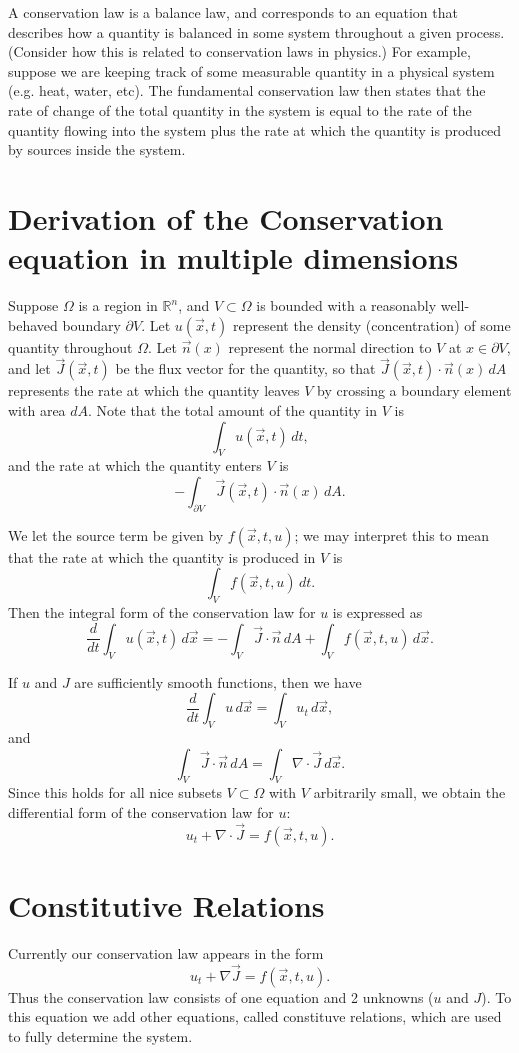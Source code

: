 \label{lab:finitedifference1}
A conservation law is a balance law, and corresponds to an equation that describes how a quantity is balanced in some system throughout a given process.
(Consider how this is related to conservation laws in physics.)
For example, suppose we are keeping track of some measurable quantity in a physical system (e.g. heat, water, etc).
The fundamental conservation law then states that the rate of change of the total quantity in the system is equal to the rate of the quantity flowing into the system plus the rate at which the quantity is produced by sources inside the system.

\section{Derivation of the Conservation equation in multiple dimensions}
Suppose $\Omega$ is a region in $\mathbb{R}^n$, and $V \subset \Omega$ is bounded with a reasonably well-behaved boundary $\partial V$.
Let $u(\vec{x},t)$ represent the density (concentration) of some quantity throughout $\Omega$.
Let $\vec{n}(x)$ represent the normal direction to $V$ at $x \in \partial V$, and let $\vec{J}(\vec{x},t)$ be the flux vector for the quantity, so that $\vec{J}(\vec{x},t) \cdot \vec{n}(x) \, dA$ represents the rate at which the quantity leaves $V$ by crossing a boundary element with area $dA$.
Note that the total amount of the quantity in $V$ is
\[ \int_V u(\vec{x},t)\, dt,\]
and the rate at which the quantity enters $V$ is
\[-\int_{\partial V} \vec{J}(\vec{x},t) \cdot \vec{n}(x) \, dA.\]

We let the source term be given by $f(\vec{x},t,u)$; we may interpret this to mean that the rate at which the quantity is produced in $V$ is 
\[\int_V f(\vec{x},t,u)\, dt.\]
Then the integral form of the conservation law for $u$ is expressed as 
\[\frac{d}{dt} \int_V u(\vec{x},t) \, d\vec{x} = -\int_V \vec{J}\cdot \vec{n}\, dA + \int_V f(\vec{x},t,u)\, d\vec{x}.\]

If $u$ and $J$ are sufficiently smooth functions, then we have 
\[ \frac{d}{dt} \int_V u\, d\vec{x} = \int_V u_t \, d\vec{x},\]
and 
\[ \int_V \vec{J}\cdot \vec{n}\, dA = \int_V \nabla \cdot \vec{J}\, d\vec{x} .\]
Since this holds for all nice subsets $V \subset \Omega$ with $V$ arbitrarily small, we obtain the differential form of the conservation law for $u$: 
\[ u_t + \nabla \cdot \vec{J} = f(\vec{x},t,u) .\]

\section{Constitutive Relations}
Currently our conservation law appears in the form 
\[u_t + \nabla \vec{J} = f(\vec{x},t,u).\]
Thus the conservation law consists of one equation and 2 unknowns ($u$ and $J$).
To this equation we add other equations, called constituve relations, which are used to fully determine the system. 

